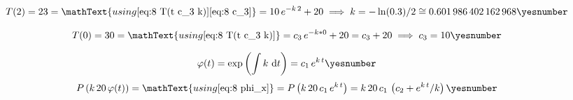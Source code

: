 \documentclass["AM3C-Slides_annotations.tex"]{subfiles}
\begin{document}
\begin{exampleBox}
  \begin{gather*}
    T(2) = 23
    = \mathText{using \eqref{eq:8 T(t c_3 k)}\eqref{eq:8 c_3}}
    = 10\,e^{-k\,2}
    + 20
    \implies
    k 
    = -\ln(0.3)/2
    \cong \num{0.601986402162968}
    \yesnumber\label{eq:8 k}
  \end{gather*}

  \begin{gather*}
    T(0) = 30
    = \mathText{using \eqref{eq:8 T(t c_3 k)}}
    = c_3\,e^{-k*0}
    + 20
    = c_3
    + 20
    \implies
    c_3 = 10
    \yesnumber\label{eq:8 c_3}
  \end{gather*}

  \begin{gather*}
    \varphi(t) 
    = \exp{\left(
      \int{k\,\odif{t}}
    \right)}
    = c_1\,e^{ k\,t }
    \yesnumber\label{eq:8 phi_x}
  \end{gather*}
  \begin{gather*}
    P\left(
      k\,20\,\varphi(t)
    \right)
    = \mathText{using \eqref{eq:8 phi_x}}
    = P\left(
      k\,20\,c_1\,e^{k\,t}
    \right)
    = k\,20\,c_1\,\left(
      c_2+e^{k\,t}/k
    \right)
    \yesnumber\label{eq:8-prim}
  \end{gather*}

\end{exampleBox}
\end{document}
